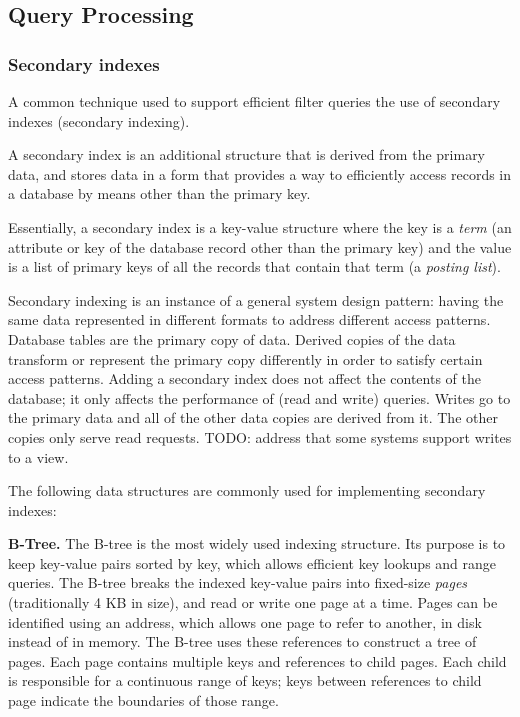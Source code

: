 \subsection{Query Processing}
\subsubsection{Secondary indexes}

A common technique used to support efficient filter queries the use of secondary indexes (secondary indexing).

A secondary index is an additional structure that is derived from the primary data, and stores data in a form that
provides a way to efficiently access records in a database by means other than the primary key.

Essentially, a secondary index is a key-value structure where the key is a \textit{term} (an attribute or key of the
database record other than the primary key) and the
value is a list of primary keys of all the records that contain that term (a \textit{posting list}).

Secondary indexing is an instance of a general system design pattern:
having the same data represented in different formats to address different access patterns.
Database tables are the primary copy of data.
Derived copies of the data transform or represent the primary copy differently in order to satisfy certain access patterns.
Adding a secondary index does not affect the contents of the database; it only affects the performance of (read and write)
queries.
Writes go to the primary data and all of the other data copies are derived from it.
The other copies only serve read requests.
TODO: address that some systems support writes to a view.

The following data structures are commonly used for implementing secondary indexes:

\medskip
\noindent
\textbf{B-Tree.}
The B-tree is the most widely used indexing structure.
Its purpose is to keep key-value pairs sorted by key, which allows efficient key lookups and range queries.
The B-tree breaks the indexed key-value pairs into fixed-size  \textit{pages} (traditionally 4 KB in size),
and read or write one page at a time.
Pages can be identified using an address, which allows one page to refer to another, in disk instead of in memory.
The B-tree uses these references to construct a tree of pages.
Each page contains multiple keys and references to child pages.
Each child is responsible for a continuous range of keys; keys between references to child page indicate the boundaries
of those range.

